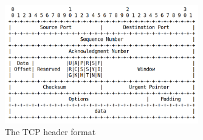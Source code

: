 \begin{figure}[!htb]
\centering
\includegraphics[width=0.75\textwidth]{images/tcp_header}
\caption{The TCP header format}
\label{fig:tcp_header}
\end{figure}

